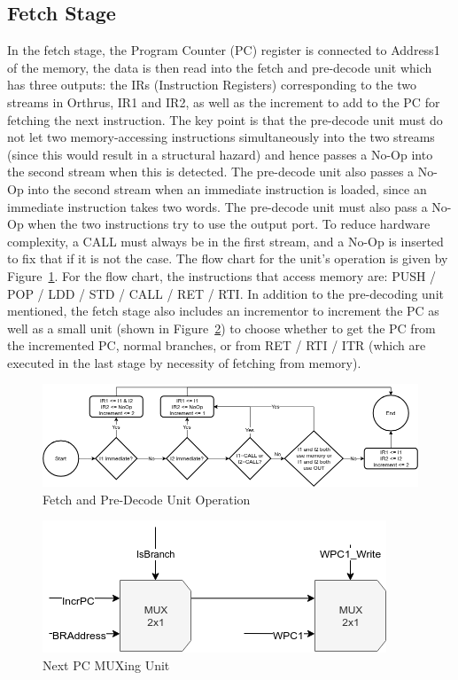 \documentclass[12pt]{article}
\theoremstyle{plain}
\theoremstyle{definition}
\begin{document}
\subsection{Fetch Stage}
In the fetch stage, the Program Counter (PC) register is connected to Address1 of the memory, the data is then read into the fetch and pre-decode unit which has three outputs: the IRs (Instruction Registers) corresponding to the two streams in Orthrus, IR1 and IR2, as well as the increment to add to the PC for fetching the next instruction. The key point is that the pre-decode unit must do not let two memory-accessing instructions simultaneously into the two streams (since this would result in a structural hazard) and hence passes a No-Op into the second stream when this is detected. The pre-decode unit also passes a No-Op into the second stream when an immediate instruction is loaded, since an immediate instruction takes two words. The pre-decode unit must also pass a No-Op when the two instructions try to use the output port. To reduce hardware complexity, a CALL must always be in the first stream, and a No-Op is inserted to fix that if it is not the case. The flow chart for the unit's operation is given by Figure~\ref{fetch-pre-decode-unit}. For the flow chart, the instructions that access memory are: PUSH / POP / LDD / STD / CALL / RET / RTI. In addition to the pre-decoding unit mentioned, the fetch stage also includes an incrementor to increment the PC as well as a small unit (shown in Figure~\ref{fetch-predecode-npc}) to choose whether to get the PC from the incremented PC, normal branches, or from RET / RTI / ITR (which are executed in the last stage by necessity of fetching from memory).

\begin{figure}
    \centering
    \includegraphics[width=\textwidth]{Diagrams/fetch_predecode_su}
    \caption{Fetch and Pre-Decode Unit Operation}
    \label{fetch-pre-decode-unit}
\end{figure}

\begin{figure}
    \centering
    \includegraphics{Diagrams/fetch_predecode_npc.png}
    \caption{Next PC MUXing Unit}
    \label{fetch-predecode-npc}
\end{figure}
\end{document}
